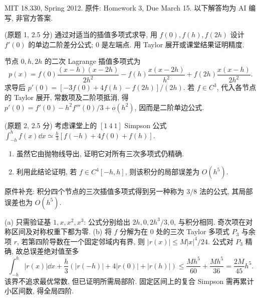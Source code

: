 MIT 18.330, Spring 2012. 原件: Homework 3, Due March 15. 以下解答均为 AI 编写, 非官方答案.

\begin{exercise}\label{ps3-q1}
(原题 1, 2.5 分) 通过对适当的插值多项式求导, 用 $f(0),f(h),f(2h)$ 设计 $f'(0)$ 的单边二阶差分公式; $0$ 是左端点. 用 Taylor 展开或课堂结果证明精度.
\end{exercise}
\begin{solution}
节点 $0,h,2h$ 的二次 Lagrange 插值多项式为
\[
p(x)=f(0)\frac{(x-h)(x-2h)}{2h^2}
-f(h)\frac{x(x-2h)}{h^2}+f(2h)\frac{x(x-h)}{2h^2}.
\]
求导后 $p'(0)=[-3f(0)+4f(h)-f(2h)]/(2h)$. 若 $f\in C^3$, 代入各节点的 Taylor 展开, 常数项及二阶项抵消, 得 $p'(0)=f'(0)-h^2f'''(0)/3+o(h^2)$, 因而是二阶单边公式.
\end{solution}

\begin{exercise}\label{ps3-q2}
(原题 2, 2.5 分) 考虑课堂上的 $[1\ 4\ 1]$ Simpson 公式
$\int_{-h}^h f(x)\dd x\simeq\frac h3[f(-h)+4f(0)+f(h)]$.
\begin{enumerate}[label=(\alph*)]
\item 虽然它由抛物线导出, 证明它对所有三次多项式仍精确.
\item 利用此结论证明, 若 $f\in C^4[-h,h]$, 则该积分的局部误差为 $O(h^5)$.
\end{enumerate}
原件补充: 积分四个节点的三次插值多项式得到另一种称为 $3/8$ 法的公式, 其局部误差也为 $O(h^5)$.
\end{exercise}
\begin{solution}
(a) 只需验证基 $1,x,x^2,x^3$: 公式分别给出 $2h,0,2h^3/3,0$, 与积分相同. 奇次项在对称区间及对称权重下都为零.
(b) 将 $f$ 分解为在 $0$ 处的三次 Taylor 多项式 $P_3$ 与余项 $r$, 若第四阶导数在一个固定邻域内有界, 则 $|r(x)|\le M|x|^4/24$. 公式对 $P_3$ 精确, 故总误差绝对值至多
\[
\int_{-h}^h|r(x)|\dd x+
\frac h3(|r(-h)|+4|r(0)|+|r(h)|)
\le \frac{Mh^5}{60}+\frac{Mh^5}{36}=\frac{2M}{45}h^5.
\]
该界不追求最优常数, 但已证明所需局部阶. 固定区间上的复合 Simpson 需再累计小区间数, 得全局四阶.
\end{solution}

